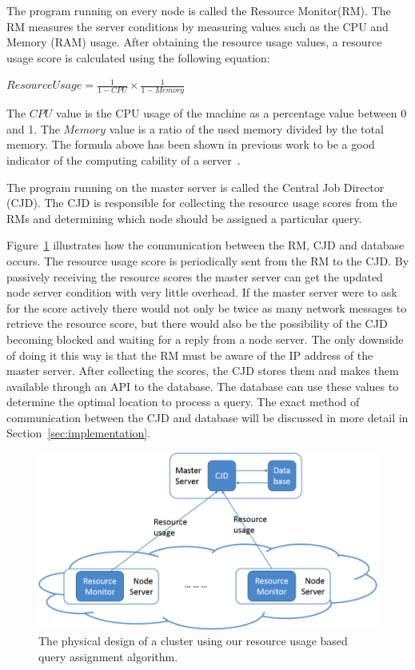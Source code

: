 The program running on every node is called the Resource Monitor(RM). The RM measures the server conditions by measuring values such as the CPU and Memory (RAM) usage. After obtaining the resource usage values, a resource usage score is calculated using the following equation:

\begin{center}
$ResourceUsage = \frac{1}{1-CPU} \times \frac{1}{1-Memory}$
\end{center}

The $CPU$ value is the CPU usage of the machine as a percentage value between 0 and 1. The $Memory$ value is a ratio of the used memory divided by the total memory. The formula above has been shown in previous work to be a good indicator of the computing cability of a server~\cite{Wood:2007:BGS:1973430.1973447}.

The program running on the master server is called the Central Job Director (CJD). The CJD is responsible for collecting the resource usage scores from the RMs and determining which node should be assigned a particular query.

Figure~\ref{fig:designFig} illustrates how the communication between the RM, CJD and database occurs. The resource usage score is periodically sent from the RM to the CJD. By passively receiving the resource scores the master server can get the updated node server condition with very little overhead. If the master server were to ask for the score actively there would not only be twice as many network messages to retrieve the resource score, but there would also be the possibility of the CJD becoming blocked and waiting for a reply from a node server. The only downside of doing it this way is that the RM must be aware of the IP address of the master server. After collecting the scores, the CJD stores them and makes them available through an API to the database. The database can use these values to determine the optimal location to process a query. The exact method of communication between the CJD and database will be discussed in more detail in Section~\ref{sec:implementation}.

\begin{figure}[t]
\centering
\includegraphics[scale=0.5]{images/design.png}
\caption{The physical design of a cluster using our resource usage based query assignment algorithm.}
\label{fig:designFig}
\end{figure}

